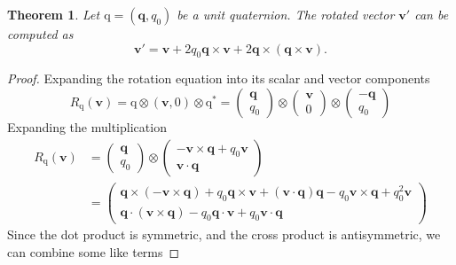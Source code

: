\documentclass{amsart}
\newtheorem{theorem}{Theorem}[section]
\theoremstyle{definition}
\theoremstyle{remark}
\numberwithin{equation}{section}
\begin{document}
\begin{theorem}
  Let $\mathrm{q}=(\mathbf{q}, q_0)$ be a unit quaternion. The rotated vector $\mathbf{v}'$ can be computed as
  \begin{equation}
    \mathbf{v}' = \mathbf{v} + 2q_0\mathbf{q}\times\mathbf{v} + 2\mathbf{q}\times\left(\mathbf{q}\times\mathbf{v}\right).
  \end{equation}
\end{theorem}
\begin{proof}
  Expanding the rotation equation into its scalar and vector components
  \begin{equation}
    R_\mathrm{q}(\mathbf{v}) = \mathrm{q} \otimes (\mathbf{v}, 0) \otimes \mathrm{q}^* =
    \begin{pmatrix}
      \mathbf{q} \\
      q_0
    \end{pmatrix} \otimes
    \begin{pmatrix}
      \mathbf{v} \\
      0
    \end{pmatrix} \otimes
    \begin{pmatrix}
      -\mathbf{q} \\
      q_0
    \end{pmatrix} \nonumber
  \end{equation}
  Expanding the multiplication
  \begin{align}
    R_\mathrm{q} (\mathbf{v}) &=
    \begin{pmatrix}
      \mathbf{q} \\
      q_0
    \end{pmatrix} \otimes
    \begin{pmatrix}
      -\mathbf{v}\times\mathbf{q} + q_0\mathbf{v} \\
      \mathbf{v}\cdot\mathbf{q}
    \end{pmatrix} \nonumber \\
    &=
    \begin{pmatrix}
      \mathbf{q}\times\left(-\mathbf{v}\times\mathbf{q}\right) + q_0\mathbf{q}\times\mathbf{v} + (\mathbf{v}\cdot\mathbf{q})\mathbf{q} - q_0\mathbf{v}\times\mathbf{q} + q_0^2\mathbf{v} \\
      \mathbf{q}\cdot(\mathbf{v}\times\mathbf{q}) - q_0\mathbf{q}\cdot\mathbf{v} + q_0\mathbf{v}\cdot\mathbf{q}
    \end{pmatrix} \nonumber
  \end{align}
  Since the dot product is symmetric, and the cross product is antisymmetric, we can combine some like terms

\end{proof}
\end{document}
